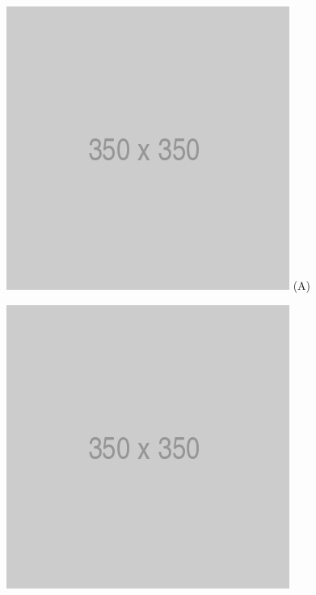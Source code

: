\begin{figure}[htp]
\centering
\begin{minipage}{0.4\textwidth}
  \centering
  \includegraphics[width=\linewidth]{images/placeholder.png}
  (A)
\end{minipage}  
\begin{minipage}{0.4\textwidth}
  \centering
  \includegraphics[width=\linewidth]{images/placeholder.png}

\end{minipage}
\end{figure}
